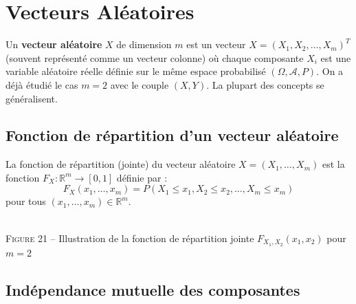 \chapter{Vecteurs Aléatoires}

Un \textbf{vecteur aléatoire} $X$ de dimension $m$ est un vecteur $X = (X_1, X_2, \dots, X_m)^T$ (souvent représenté comme un vecteur colonne) où chaque composante $X_i$ est une variable aléatoire réelle définie sur le même espace probabilisé $(\Omega, \mathcal{A}, P)$. On a déjà étudié le cas $m = 2$ avec le couple $(X, Y)$. La plupart des concepts se généralisent.

\section{Fonction de répartition d'un vecteur aléatoire}

La fonction de répartition (jointe) du vecteur aléatoire $X = (X_1, \dots, X_m)$ est la fonction $F_X : \mathbb{R}^m \to [0, 1]$ définie par :
\[
F_X(x_1, \dots, x_m) = P(X_1 \le x_1, X_2 \le x_2, \dots, X_m \le x_m)
\]
pour tous $(x_1, \dots, x_m) \in \mathbb{R}^m$.

\begin{center}
\\[0.5em]
\textsc{Figure 21} – Illustration de la fonction de répartition jointe $F_{X_1,X_2}(x_1, x_2)$ pour $m=2$
\end{center}

\section{Indépendance mutuelle des composantes}

